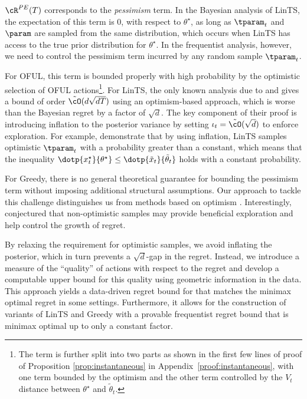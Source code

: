 $\cR^{PE}(T)$ corresponds to the \emph{pessimism} term. In the Bayesian analysis of LinTS, the expectation of this term is $0$, with respect to $\theta^\star$, as long as $\tparam_t$ and $\param$ are sampled from the same distribution, which occurs when LinTS has access to the true prior distribution for $\theta^\star$. In the frequentist analysis, however, we need to control the pessimism term incurred by any random sample $\tparam_t$.

For OFUL, this term is bounded properly with high probability by the optimistic selection of OFUL actions\footnote{The term is further split into two parts as shown in the first few lines of proof of Proposition \ref{prop:instantaneous} in Appendix~\ref{proof:instantaneous}, with one term bounded by the optimism and the other term controlled by the $V_t$ distance between $\theta^{\star}$ and $\tilde{\theta}_t$.}. For LinTS, the only known analysis due to \cite{agrawal2013thompson} and \cite{abeille2017linear} gives a bound of order $\tilde{\cO}(d\sqrt{dT})$ using an optimism-based approach, which is worse than the Bayesian regret by a factor of $\sqrt{d}$. The key component of their proof is introducing inflation to the posterior variance by setting $\iota_t =\tilde{\cO}(\sqrt{d})$ to enforce exploration. For example, \cite{abeille2017linear} demonstrate that by using inflation, LinTS samples optimistic $\tparam_t$ with a probability greater than a constant, which means that the inequality $\dotp{x_t^\star}{ \theta^{\star}}\leq \dotp{\tilde{x}_t}{\tilde{\theta}_t}$ holds with a constant probability.

For Greedy, there is no general theoretical guarantee for bounding the pessimism term without imposing additional structural assumptions. Our approach to tackle this challenge distinguishes us from methods based on optimism \citep{agrawal2013thompson,abeille2017linear}. Interestingly, \cite{abeille2017linear} conjectured that non-optimistic samples may provide beneficial exploration and help control the growth of regret.

By relaxing the requirement for optimistic samples, we avoid inflating the posterior, which in turn prevents a $\sqrt{d}$-gap in the regret. Instead, we introduce a measure of the ``quality'' of \POFUL{} actions with respect to the regret and develop a computable upper bound for this quality using geometric information in the data. This approach yields a data-driven regret bound for \POFUL{} that matches the minimax optimal regret in some settings. Furthermore, it allows for the construction of variants of LinTS and Greedy with a provable frequentist regret bound that is minimax optimal up to only a constant factor.

